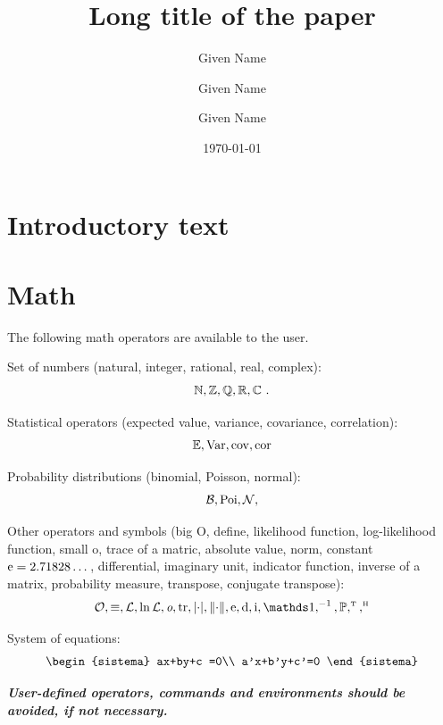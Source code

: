 \documentclass{statagroupwp}
\title{Long title of the paper}
\author{Given Name}{Family Name}{Department of xxx, University of xxx}
\author[*]{Given Name}{Family Name}{Department of xxx, University of xxx}
\author{Given Name}{Family Name}{Department of xxx, University of xxx}
\date{\today}
\begin{document}
\maketitle

\begin{abstract}
\lipsum[1]


\end{abstract}

\section{Introductory text}

\lipsum[1-2]

\section{Math}

The following math operators are available to the user.

Set of numbers (natural, integer, rational, real, complex):
\[
\operatorname{\mathbb{N}}, \operatorname{\mathbb{Z}}, \operatorname{\mathbb{Q}}, \operatorname{\mathbb{R}}, \operatorname{\mathbb{C}}\,.
\]

Statistical operators (expected value, variance, covariance, correlation):
\[
\operatorname{\mathbb{E}}, \operatorname{Var}, \operatorname{cov}, \operatorname{cor}
\]

Probability distributions (binomial, Poisson, normal):
\[
\operatorname{\mathcal{B}}, \operatorname{Poi}, \operatorname{\mathcal{N}},
\]

Other operators and symbols (big O, define, likelihood function, log-likelihood function, small o, trace of a matric, absolute value, norm, constant $\mathrm{e}=2.71828\dots$, differential, imaginary unit, indicator function, inverse of a matrix, probability measure, transpose, conjugate transpose):
\[
\bigO, \define, \Lik, \logLik, \smallo, \trace, \abs{\cdot}, \norma{\cdot},
\eu, \diff, \iu, \ind, \inv, \Pr, \T, \HH
\]

System of equations:
\[
\begin{sistema}
ax+by+c =0\\
a'x+b'y+c'=0
\end{sistema}
\]

\noindent\textbf{\em User-defined operators, commands and environments should be avoided, if not necessary.}
\end{document}
